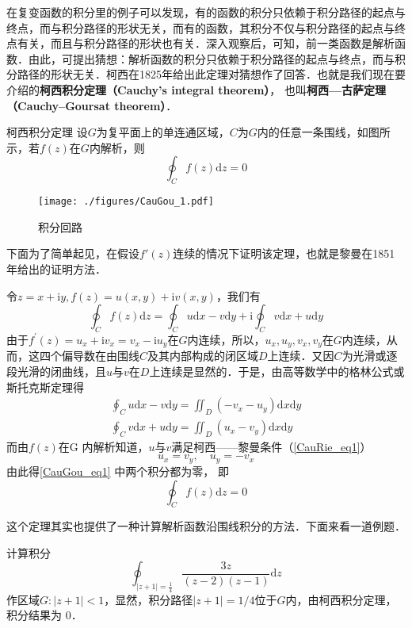 

在复变函数的积分里的例子可以发现，有的函数的积分只依赖于积分路径的起点与终点，而与积分路径的形状无关，而有的函数，其积分不仅与积分路径的起点与终点有关，而且与积分路径的形状也有关．深入观察后，可知，前一类函数是解析函数．由此，可提出猜想：解析函数的积分只依赖于积分路径的起点与终点，而与积分路径的形状无关．柯西在1825年给出此定理对猜想作了回答．也就是我们现在要介绍的\textbf{柯西积分定理（Cauchy's integral theorem）}， 也叫\textbf{柯西—古萨定理（Cauchy–Goursat theorem）}．

\begin{theorem}{柯西积分定理}
设$G $为复平面上的单连通区域，$C $为$G $内的任意一条围线，如图所示，若$f (z)$在$G $内解析，则
\begin{equation}
\oint_{C} f(z) \mathrm{d} z=0
\end{equation}
\begin{figure}[ht]
\centering
\texttt{[image: ./figures/CauGou\_1.pdf]}
\caption{积分回路} \label{CauGou_fig1}
\end{figure}

下面为了简单起见，在假设$f'(z)$连续的情况下证明该定理，也就是黎曼在1851年给出的证明方法．

令$z=x+\mathrm{i} y, f(z)=u(x, y)+\mathrm{i} v(x, y)$，我们有
\begin{equation}
\oint_{C} f(z) \mathrm{d} z=\oint_{C} u \mathrm{d} x-v \mathrm{d} y+\mathrm{i} \oint_{C} v \mathrm{d} x+u \mathrm{d} y
\end{equation}
由于$f^{\prime}(z)=u_{x}+\mathrm{i} v_{x}=v_{x}-\mathrm{i} u_{y}$在$G $内连续，所以，$u_{x}, u_{y}, v_{x}, v_{y}$在$G $内连续，从而，这四个偏导数在由围线$C$及其内部构成的闭区域$D $上连续．又因$C $为光滑或逐段光滑的闭曲线，且$u $与$v $在$D $上连续是显然的．于是，由高等数学中的格林公式或斯托克斯定理得
\begin{equation}\label{CauGou_eq1}
\begin{aligned}\oint_C u \mathrm{d} x-v \mathrm{d} y=\iint_{D}\left(-v_{x}-u_{y}\right) \mathrm{d} x \mathrm{d} y \\ \oint_C v \mathrm{d} x+u \mathrm{d} y=\iint_{D}\left(u_{x}-v_{y}\right) \mathrm{d} x \mathrm{d} y\end{aligned}
\end{equation}
而由$ f (z)$在G 内解析知道，$u$与$v$满足柯西——黎曼条件（\autoref{CauRie_eq1}）
\begin{equation}
u_{x}=v_{y}, \quad u_{y}=-v_{x}
\end{equation}
由此得\autoref{CauGou_eq1} 中两个积分都为零， 即
\begin{equation}
\oint_{C} f(z) \mathrm{d} z=0
\end{equation}
\end{theorem}
这个定理其实也提供了一种计算解析函数沿围线积分的方法．下面来看一道例题．
\begin{example}{}
计算积分
\begin{equation}
\oint_{|z+1|=\frac{1}{4}} \frac{3 z}{(z-2)(z-1)} \mathrm{d} z
\end{equation}
作区域$G:|z+1|<1$，显然，积分路径$|z+1|=1/4$位于$G$内，由柯西积分定理， 积分结果为 0．
\end{example}
